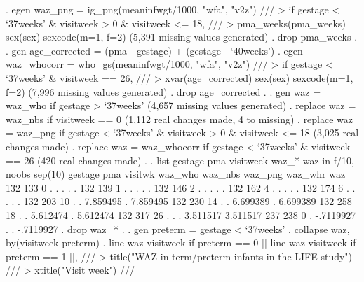 {\smallskip}
. egen waz_png = ig_png(meaninfwgt/1000, "wfa", "v2z") ///
>         if gestage < `37weeks' \& visitweek > 0 \& visitweek <= 18, ///
>         pma_weeks(pma_weeks) sex(sex) sexcode(m=1, f=2)
(5,391 missing values generated)
{\smallskip}
. drop pma_weeks
{\smallskip}
. 
. gen age_corrected = (pma - gestage) + (gestage - `40weeks')
{\smallskip}
. egen waz_whocorr = who_gs(meaninfwgt/1000, "wfa", "v2z") ///
>         if gestage < `37weeks' \& visitweek == 26, ///
>         xvar(age_corrected) sex(sex) sexcode(m=1, f=2)
(7,996 missing values generated)
{\smallskip}
. drop age_corrected
{\smallskip}
. 
. gen waz = waz_who if gestage > `37weeks'
(4,657 missing values generated)
{\smallskip}
. replace waz = waz_nbs if visitweek == 0
(1,112 real changes made, 4 to missing)
{\smallskip}
. replace waz = waz_png if gestage < `37weeks' \& visitweek > 0 \& visitweek <= 18
(3,025 real changes made)
{\smallskip}
. replace waz = waz_whocorr if gestage < `37weeks' \& visitweek == 26
(420 real changes made)
{\smallskip}
. 
. list gestage pma visitweek waz_* waz in f/10, noobs sep(10)
{\smallskip}
  {\TLC}
  {\VBAR} gestage   pma   visitw{\tytilde}k   waz_who     waz_nbs    waz_png   waz_wh{\tytilde}r         waz {\VBAR}
  {\LFTT}
  {\VBAR}     132   133          0         .           .          .          .           . {\VBAR}
  {\VBAR}     132   139          1         .           .          .          .           . {\VBAR}
  {\VBAR}     132   146          2         .           .          .          .           . {\VBAR}
  {\VBAR}     132   162          4         .           .          .          .           . {\VBAR}
  {\VBAR}     132   174          6         .           .          .          .           . {\VBAR}
  {\VBAR}     132   203         10         .           .   7.859495          .    7.859495 {\VBAR}
  {\VBAR}     132   230         14         .           .   6.699389          .    6.699389 {\VBAR}
  {\VBAR}     132   258         18         .           .   5.612474          .    5.612474 {\VBAR}
  {\VBAR}     132   317         26         .           .          .   3.511517    3.511517 {\VBAR}
  {\VBAR}     237   238          0         .   -.7119927          .          .   -.7119927 {\VBAR}
  {\BLC}
{\smallskip}
. drop waz_*
{\smallskip}
. 
. gen preterm = gestage < `37weeks'
{\smallskip}
. collapse waz, by(visitweek preterm)
{\smallskip}
. line waz visitweek if preterm == 0 || line waz visitweek if preterm == 1 ||, ///
>         title("WAZ in term/preterm infants in the LIFE study") ///
>         xtitle("Visit week") ///
